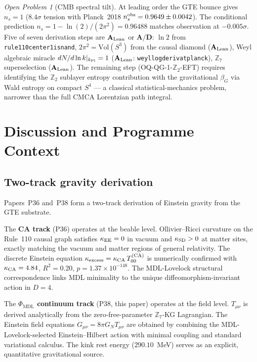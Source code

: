 \documentclass[11pt]{article}
\theoremstyle{remark}
\newtheorem{openprob}[theorem]{Open Problem}
\newcommand{\PHIMDL}{\Phi_{\mathrm{MDL}}}
\newcommand{\ZS}{\mathbb{Z}_7}
\newcommand{\lean}[1]{%
  \penalty-100
  \begingroup\def\_{\textunderscore\allowbreak}\texttt{#1}\endgroup}
\newcommand{\CatAL}{\ensuremath{\textbf{A}_{\rm Lean}}}
\newcommand{\CatAD}{\textbf{A/D}}
\newcommand{\Tmunu}{T_{\mu\nu}}
\newcommand{\GN}{G_N}
\begin{document}
\begin{openprob}[CMB spectral tilt]
\label{op:cmb}
At leading order the GTE bounce gives $n_s = 1$ ($8.4\sigma$ tension with Planck~2018
$n_s^{\rm obs} = 0.9649\pm0.0042$).  The conditional prediction
$n_s = 1-\ln(2)/(2\pi^2) = 0.96488$ matches observation at $-0.005\sigma$.
Five of seven derivation steps are $\CatAL$ or $\CatAD$: $\ln 2$ from
\lean{rule110\_center1\_is\_nand}, $2\pi^2 = \mathrm{Vol}(S^3)$ from the causal
diamond ($\CatAL$), Weyl algebraic miracle $dN/d\ln k|_{k_{\rm Pl}}=1$ ($\CatAL$:
\lean{weyl\_log\_deriv\_at\_planck}), $\ZS$ superselection ($\CatAL$).
The remaining step (OQ-QG-1-$\mathbb{Z}_2$-EFT) requires identifying the $\mathbb{Z}_2$
sublayer entropy contribution with the gravitational $\beta_G$ via Wald entropy on
compact $S^4$ --- a classical statistical-mechanics problem, narrower than the
full CMCA Lorentzian path integral.
\end{openprob}

\section{Discussion and Programme Context}
\label{sec:prog_context}

\subsection{Two-track gravity derivation}

Papers~P36 and~P38 form a two-track derivation of Einstein gravity from the GTE substrate.

The \textbf{CA track} (P36) operates at the beable level.
Ollivier--Ricci curvature on the Rule~110 causal graph satisfies
$\kappa_{\rm EE} = 0$ in vacuum and $\kappa_{\rm SD} > 0$ at matter sites,
exactly matching the vacuum and matter regions of general relativity.
The discrete Einstein equation $\kappa_{\rm excess} = \kappa_{\rm CA}\,T_{00}^{(\rm CA)}$
is numerically confirmed with $\kappa_{\rm CA} = 4.84$, $R^2=0.20$, $p=1.37\times10^{-148}$.
The MDL-Lovelock structural correspondence links MDL minimality to the unique
diffeomorphism-invariant action in $D=4$.

The \textbf{$\PHIMDL$ continuum track} (P38, this paper) operates at the field level.
$\Tmunu$ is derived analytically from the zero-free-parameter $\ZS$-KG Lagrangian.
The Einstein field equations $G_{\mu\nu} = 8\pi\GN\Tmunu$ are obtained by
combining the MDL-Lovelock-selected Einstein--Hilbert action with minimal
coupling and standard variational calculus.
The kink rest energy ($290.10$~MeV) serves as an explicit, quantitative
gravitational source.
\end{document}
